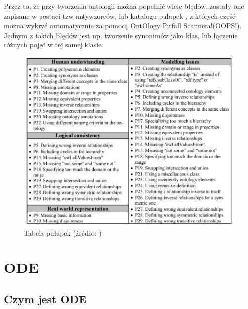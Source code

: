 \documentclass[a4paper,12pt, twoside]{book} %
\begin{document}
Przez to, że przy tworzeniu ontologii można popełnić wiele błędów, zostały one zapisane w postaci tzw antywzorców, lub katalogu pułapek \cite{oops}, z których część można wykryć automatycznie za pomocą OntOlogy Pitfall Scannera!(OOPS!). Jednym z takich błędów jest np. tworzenie synonimów jako klas, lub łączenie różnych pojęć w tej samej klasie.\cite{C.MariaKeet.2020}

\begin{figure}[h]
	\centering
	\includegraphics[scale=0.55]{tab_oops.png}
	\caption{Tabela pułapek (źródło: \cite{oops})}
\end{figure}

\chapter{ODE}

\section{Czym jest ODE}
\end{document}
